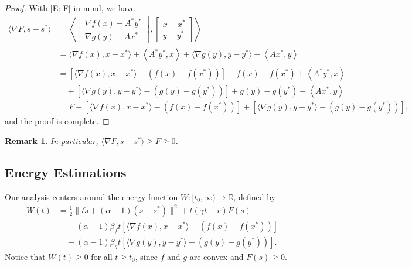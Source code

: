 \documentclass[pdflatex,sn-mathphys-num]{sn-jnl}
\theoremstyle{thmstyleone}
\theoremstyle{thmstyletwo}
\newtheorem{remark}[theorem]{Remark}
\theoremstyle{thmstylethree}
\newcommand{\R}{\mathbb{R}}
\begin{document}
\begin{proof}
With \eqref{E: F} in mind, we have
\begin{align*}
\langle \nabla F, s-s^* \rangle
&= \left\langle \begin{bmatrix}
\nabla f(x) + A^* y^*\\[2pt]
\nabla g(y) - Ax^*
\end{bmatrix}, \begin{bmatrix}
x-x^*\\[2pt]
y-y^*
\end{bmatrix}  \right\rangle \\
&= \langle \nabla f(x), x-x^* \rangle + \left\langle A^* y^*, x \right\rangle + \langle \nabla g(y), y-y^* \rangle - \left\langle Ax^*, y \right\rangle\\
&= [ \langle \nabla f(x), x-x^* \rangle - \left( f(x) - f(x^*) \right) ] + f(x) - f(x^*) + \left\langle A^* y^*, x \right\rangle \\
&\quad + [ \langle \nabla g(y), y-y^* \rangle - \left( g(y) - g(y^*) \right) ] + g(y) - g(y^*) - \left\langle Ax^*, y \right\rangle \\
&= F + [ \langle \nabla f(x), x-x^* \rangle - \left( f(x) - f(x^*) \right) ] 
  + [ \langle \nabla g(y), y-y^* \rangle - \left( g(y) - g(y^*) \right) ],      
\end{align*}
and the proof is complete.
\end{proof}

\begin{remark}
    In particular, $\langle \nabla F, s-s^* \rangle\ge F\ge 0$.
\end{remark}




\subsection{Energy Estimations}
Our analysis centers around the energy function $W:[t_0,\infty)\to\R$, defined by
\begin{equation}\label{E: W_AVD}
\begin{aligned}
W(t)
&= \frac{1}{2}\| t\dot{s} + (\alpha-1)(s-s^*) \|^2 + t(\gamma t + r)F(s) \\
&\quad + (\alpha-1)\beta_f t \left[\langle \nabla f(x), x-x^* \rangle - \left( f(x) - f(x^*) \right) \right] \\ 
&\quad + (\alpha-1)\beta_g t \left[ \langle \nabla g(y), y-y^* \rangle - \left( g(y) - g(y^*) \right) \right].
\end{aligned}
\end{equation}
Notice that $W(t)\ge 0$ for all $t\ge t_0$, since $f$ and $g$ are convex and $F(s)\ge 0$. 
\end{document}
